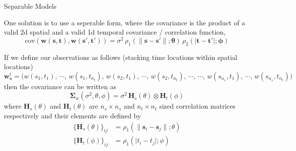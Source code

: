 \documentclass[11pt,ignorenonframetext,]{beamer}
\begin{document}
\begin{frame}{Separable Models}

One solution is to use a seperable form, where the covariance is the
product of a valid 2d spatial and a valid 1d temporal covariance /
correlation function, \[
\text{cov}(\bm{w}(\bm{s},\bm{t}), \bm{w}(\bm{s}',\bm{t}')) = \sigma^2 \, \rho_1(\lVert \bm{s}-\bm{s}'\rVert;\bm\theta) \, \rho_2(\lvert \bm{t}-\bm{t}' \rvert; \bm{\phi})
\]

\pause

If we define our observations as follows (stacking time locations within
spatial locations) \scriptsize
\[
\bm{w}^t_{\bm{s}} = \big(
  w(s_1,t_1)     ,\, \cdots ,\, w(s_1,t_{n_t}) ,\,
  w(s_2,t_1)     ,\, \cdots ,\, w(s_2,t_{n_t}) ,\, \cdots ,\, \cdots ,\,
  w(s_{n_s},t_1) ,\, \cdots ,\, w(s_{n_s},t_{n_t}) \big)
\] \normalsize
then the covariance can be written as \[
\bm\Sigma_w(\sigma^2, \theta, \phi) = \sigma^2 \, \bm{H}_s(\theta) \otimes \bm{H}_t(\phi)
\] where \(\bm{H}_s(\theta)\) and \(\bm{H}_t(\theta)\) are
\(n_s \times n_s\) and \(n_t \times n_t\) sized correlation matrices
respectively and their elements are defined by \footnotesize
\[\begin{aligned}
\{\bm{H}_s(\theta)\}_{ij} &= \rho_1(\lVert \bm{s}_i - \bm{s}_j \rVert; \theta) \\
\{\bm{H}_t(\phi)\}_{ij} &= \rho_1(\lvert t_i - t_j \rvert; \phi) \\
\end{aligned}\]

\end{frame}
\end{document}
